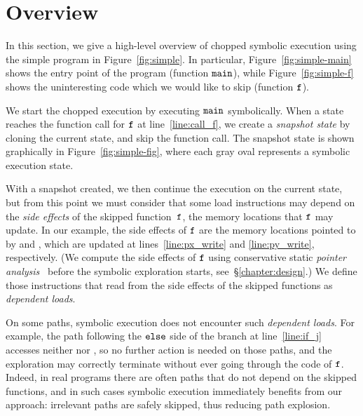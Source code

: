 

\chapter{Overview}\label{chapter:overview}

In this section, we give a high-level overview of chopped symbolic
execution using the simple program in Figure~\ref{fig:simple}. In
particular, Figure~\ref{fig:simple-main} shows the entry point of the
program (function $\texttt{main}$), while Figure~\ref{fig:simple-f}
shows the uninteresting code which we would like to skip (function
$\texttt{f}$).

We start the chopped execution by executing $\texttt{main}$
symbolically. When a state reaches the function call for $\texttt{f}$ at
line~\ref{line:call_f}, we create a \textit{snapshot state} by cloning
the current state, and skip the function call. The snapshot state is
shown graphically in Figure~\ref{fig:simple-fig}, where each gray oval
represents a symbolic execution state.

With a snapshot created, we then continue the execution on the current
state, but from this point we must consider that some load
instructions may depend on the \textit{side effects} of the skipped
function~$\texttt{f}$, \ie the memory locations that $\texttt{f}$ may
update. In our example, the side effects of $\texttt{f}$ are the memory
locations pointed to by  and , which are updated
at lines~\ref{line:px_write} and \ref{line:py_write}, respectively.
(We compute the side effects of $\texttt{f}$ using conservative static
\emph{pointer analysis}~\cite{andersen:pointeranalysis,
  Hind:Paste2001, Smaragdakis:FTPL2015} before the symbolic
exploration starts, see~\S\ref{chapter:design}.) We define those
instructions that read from the side effects of the skipped functions
as \textit{dependent loads}.

On some paths, symbolic execution does not encounter such
\textit{dependent loads}. For example, the path following the
$\texttt{else}$ side of the branch at line~\ref{line:if_j} accesses
neither  nor , so no further action is needed on
those paths, and the exploration may correctly terminate without ever
going through the code of $\texttt{f}$. Indeed, in real programs there
are often paths that do not depend on the skipped functions, and in
such cases symbolic execution immediately benefits from our approach:
irrelevant paths are safely skipped, thus reducing path explosion.

